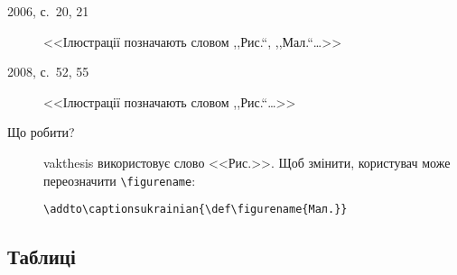 \documentclass[a4paper]{article}
\newcommand{\vakthesis}{\textsf{vakthesis}}
\begin{document}
\begin{description}
\item[2006, с.~20, 21] <<Ілюстрації позначають словом ,,Рис.``,
  ,,Мал.``\ldots{}>>

\item[2008, с.~52, 55] <<Ілюстрації позначають словом
  ,,Рис.``\ldots{}>>

\item[Що робити?] \vakthesis{} використовує слово <<Рис.>>. Щоб
  змінити, користувач може переозначити \verb|\figurename|:
\begin{verbatim}
\addto\captionsukrainian{\def\figurename{Мал.}}
\end{verbatim}
\end{description}

\subsection{Таблиці}
\end{document}
